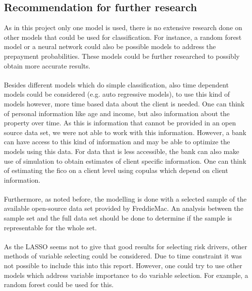 \subsection{Recommendation for further research}
    As in this project only one model is used, there is no 
    extensive research done on other models that could be 
    used for classification. For instance, a random forest 
    model or a neural network could also be possible models 
    to address the prepayment probabilities. These models 
    could be further researched to possibly obtain more accurate 
    results. 
    \\\\
    Besides different models which do simple classification, 
    also time dependent models could be considered (e.g.
    auto regressive models), to use this kind of models 
    however, more time based data about the client is 
    needed. One can think of personal information like age
    and income, but also information about the property over 
    time. As this is information that cannot be provided in 
    an open source data set, we were not able to work with 
    this information. However, a bank can have access to 
    this kind of information and may be able to optimize
    the models using this data.
    For data that is less accessible, the bank can also 
    make use of simulation to obtain estimates of client 
    specific information. One can think of estimating the 
    fico on a client level using copulas which depend
    on client information.
    \\\\
    Furthermore, as noted before, the modelling is done 
    with a selected sample of the available open-source 
    data set provided by FreddieMac. An analysis between 
    the sample set and the full data set should be done 
    to determine if the sample is representable for the 
    whole set. 
    \\\\ 
    As the LASSO seems not to give that good results for 
    selecting risk drivers, other methods of variable 
    selecting could be considered. Due to time constraint 
    it was not possible to include this into this report. 
    However, one could try to use other models which 
    address variable importance to do variable selection. 
    For example, a random forest could be used for this. 